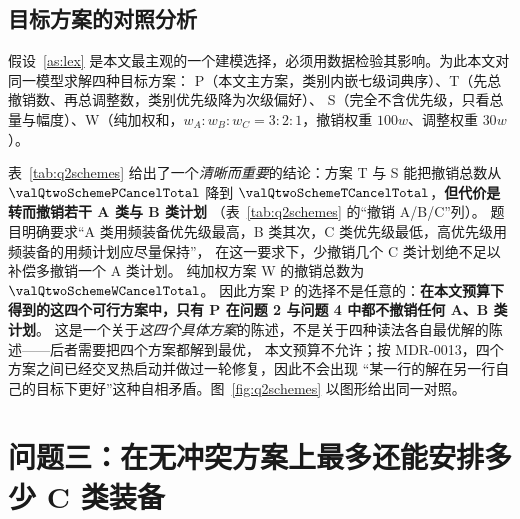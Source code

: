 \subsection{目标方案的对照分析}
\label{sec:q2schemes}

假设~\ref{as:lex} 是本文最主观的一个建模选择，必须用数据检验其影响。为此本文对同一模型求解四种目标方案：
P（本文主方案，类别内嵌七级词典序）、T（先总撤销数、再总调整数，类别优先级降为次级偏好）、
S（完全不含优先级，只看总量与幅度）、W（纯加权和，$w_A:w_B:w_C=3:2:1$，撤销权重 $100w$、调整权重 $30w$）。

\begin{table}[htbp]
\centering\small
\caption{四种目标方案在问题 2 上的对照。\textbf{方案 P 即正文主结果}（各级时限 $[20,20,600,300,300,300,240]$ s，
撤销三级已证明最优，定理~\ref{thm:q2opt}）；T、S、W 每级时限 $30$ s，且都以当时已知的最好解作为现任解热启动
（MDR-0013），故它们是\emph{在本文预算下}得到的可行点，不作最优性声明。表中“预算/用时”两列使这一差异对读者可见。}
\label{tab:q2schemes}
\resizebox{\linewidth}{!}{}
\end{table}

表~\ref{tab:q2schemes} 给出了一个\emph{清晰而重要}的结论：方案 T 与 S 能把撤销总数从 $\valQtwoSchemePCancelTotal$
降到 $\valQtwoSchemeTCancelTotal$，\textbf{但代价是转而撤销若干 A 类与 B 类计划}
（表~\ref{tab:q2schemes} 的“撤销 A/B/C”列）。
题目明确要求“A 类用频装备优先级最高，B 类其次，C 类优先级最低，高优先级用频装备的用频计划应尽量保持”，
在这一要求下，少撤销几个 C 类计划绝不足以补偿多撤销一个 A 类计划。
纯加权方案 W 的撤销总数为 $\valQtwoSchemeWCancelTotal$。
因此方案 P 的选择不是任意的：\textbf{在本文预算下得到的这四个可行方案中，只有 P 在问题 2 与问题 4 中都不撤销任何 A、B 类计划}。
这是一个关于\emph{这四个具体方案}的陈述，不是关于四种读法各自最优解的陈述——后者需要把四个方案都解到最优，
本文预算不允许；按 MDR-0013，四个方案之间已经交叉热启动并做过一轮修复，因此不会出现
“某一行的解在另一行自己的目标下更好”这种自相矛盾。图~\ref{fig:q2schemes} 以图形给出同一对照。


\section{问题三：在无冲突方案上最多还能安排多少 C 类装备}
\label{sec:q3}

